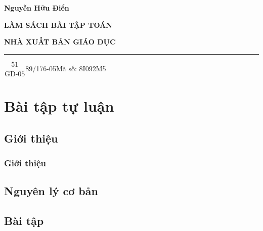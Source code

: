 \documentclass[11pt,openany]{book}
\theoremstyle{definition}
\theoremstyle{plain}
\begin{document}
\dominitoc
\begin{titlepage}
 \centerline{\bf Nguyễn Hữu Điển}
\vspace*{5cm}
 \centerline{\Huge\bf LÀM SÁCH BÀI TẬP TOÁN}
\vspace*{0.5cm}

\vfill
 \centerline{\bf NHÀ XUẤT BẢN GIÁO DỤC}
\end{titlepage}
\newpage
\vspace*{5cm}
\vfill
\hrule

$\dfrac{\mbox{51}}{\mbox{GD-05}}$89/176-05\hfill Mã số: 8I092M5
\thispagestyle{empty}

\newpage
{}
\tableofcontents

\hideanswers
\chapter{Bài tập tự luận}
\minitoc %
\thispagestyle{empty}

\section{Giới thiệu}

\subsection{Giới thiệu}

\section{Nguyên lý cơ bản}
\section{Bài tập}

\begin{enumerate}[]
\foreachproblem[bttuluan]{\item\causo \thisproblem}
\end{enumerate}
\end{document}
